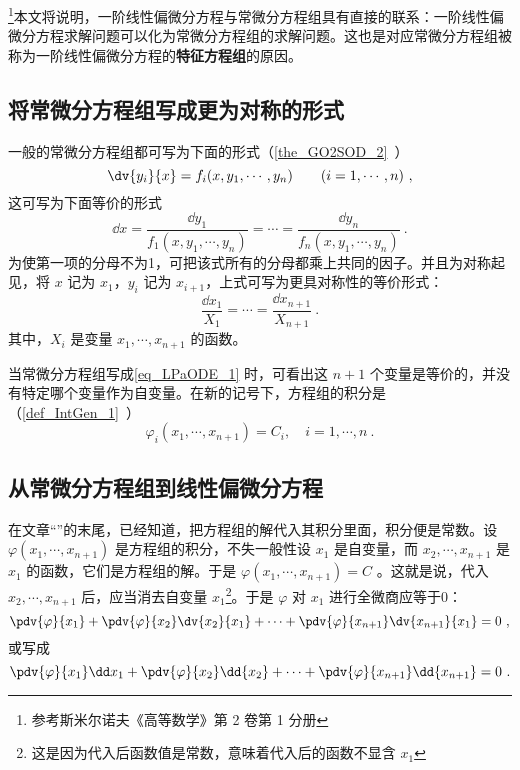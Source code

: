 \footnote{参考斯米尔诺夫《高等数学》第 2 卷第 1 分册}本文将说明，一阶线性偏微分方程与常微分方程组具有直接的联系：一阶线性偏微分方程求解问题可以化为常微分方程组的求解问题。这也是对应常微分方程组被称为一阶线性偏微分方程的\textbf{特征方程组}的原因。
\subsection{将常微分方程组写成更为对称的形式}
一般的常微分方程组都可写为下面的形式（\autoref{the_GO2SOD_2}~）
\begin{equation}\label{eq_LPaODE_4}
\dv{y_i}{x}=f_i(x,y_1,\cdots,y_n) \qquad (i=1,\cdots,n)~,
\end{equation}
这可写为下面等价的形式
\begin{equation}
\dd x=\frac{\dd y_1}{f_1(x,y_1,\cdots,y_n)}=\cdots=\frac{\dd y_n}{f_n(x,y_1,\cdots,y_n)}~.
\end{equation}
为使第一项的分母不为1，可把该式所有的分母都乘上共同的因子。并且为对称起见，将 $x$ 记为 $x_1$，$y_i$ 记为 $x_{i+1}$，上式可写为更具对称性的等价形式：
\begin{equation}\label{eq_LPaODE_1}
\frac{\dd x_1}{X_1}=\cdots=\frac{\dd x_{n+1}}{X_{n+1}}~.
\end{equation}
其中，$X_i$ 是变量 $x_1,\cdots,x_{n+1}$ 的函数。

当常微分方程组写成\autoref{eq_LPaODE_1} 时，可看出这 $n+1$ 个变量是等价的，并没有特定哪个变量作为自变量。在新的记号下，方程组的积分是（\autoref{def_IntGen_1}~）
\begin{equation}
\varphi_i(x_1,\cdots,x_{n+1})=C_i,\quad i=1,\cdots,n~.
\end{equation}
\subsection{从常微分方程组到线性偏微分方程}
在文章“”的末尾，已经知道，把方程组的解代入其积分里面，积分便是常数。设 $\varphi(x_1,\cdots,x_{n+1})$ 是方程组的积分，不失一般性设 $x_1$ 是自变量，而 $x_2,\cdots,x_{n+1}$ 是 $x_1$ 的函数，它们是方程组的解。于是 $\varphi(x_1,\cdots,x_{n+1})=C$ 。这就是说，代入 $x_2,\cdots,x_{n+1}$ 后，应当消去自变量 $x_1$\footnote{这是因为代入后函数值是常数，意味着代入后的函数不显含 $x_1$}。于是 $\varphi$ 对 $x_1$ 进行全微商应等于0：
\begin{equation}
\pdv{\varphi}{x_1}+\pdv{\varphi}{x_2}\dv{x_2}{x_1}+\cdots+\pdv{\varphi}{x_{n+1}}\dv{x_{n+1}}{x_1}=0~,
\end{equation}
或写成
\begin{equation}\label{eq_LPaODE_2}
\pdv{\varphi}{x_1}\dd x_1+\pdv{\varphi}{x_2}\dd{x_2}+\cdots+\pdv{\varphi}{x_{n+1}}\dd{x_{n+1}}=0~.
\end{equation}

